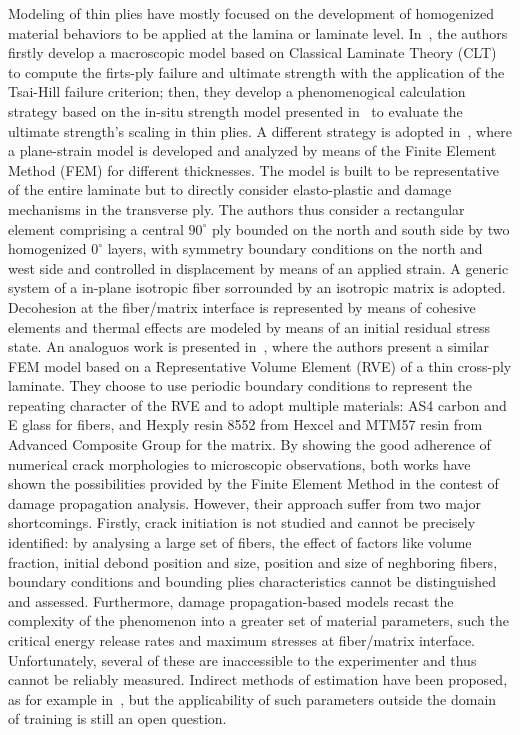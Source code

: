 \documentclass[a4paper]{jpconf}
\begin{document}
Modeling of thin plies have mostly focused on the development of homogenized material behaviors to be applied at the lamina or laminate level. In~\cite{AmacherCugnoniBotsisSorensenSmithDransfeld:2014}, the authors firstly develop a macroscopic model based on Classical Laminate Theory (CLT) to compute the firts-ply failure and ultimate strength with the application of the Tsai-Hill failure criterion; then, they develop a phenomenogical calculation strategy based on the in-situ strength model presented in~\cite{CamanhoDavilaPinhoIannucciRobinson:2006} to evaluate the ultimate strength's scaling in thin plies. A different strategy is adopted in~\cite{SaitoTakehuchiKimpara:2014}, where a plane-strain model is developed and analyzed by means of the Finite Element Method (FEM) for different thicknesses. The model is built to be representative of the entire laminate but to directly consider elasto-plastic and damage mechanisms in the transverse ply. The authors thus consider a rectangular element comprising a central $90^{\circ}$ ply bounded on the north and south side by two homogenized $0^{\circ}$ layers, with symmetry boundary conditions on the north and west side and controlled in displacement by means of an applied strain. A generic system of a in-plane isotropic fiber sorrounded by an isotropic matrix is adopted. Decohesion at the fiber/matrix interface is represented by means of cohesive elements and thermal effects are modeled by means of an initial residual stress state. An analoguos work is presented in~\cite{HerraezMoraNayaLopesGonzalezLLorca:2015}, where the authors present a similar FEM model based on a Representative Volume Element (RVE) of a thin cross-ply laminate. They choose to use periodic boundary conditions to represent the repeating character of the RVE and to adopt multiple materials: AS4 carbon and E glass for fibers, and Hexply resin 8552 from Hexcel and MTM57 resin from Advanced Composite Group for the matrix. By showing the good adherence of numerical crack morphologies to microscopic observations, both works have shown the possibilities provided by the Finite Element Method in the contest of damage propagation analysis. However, their approach suffer from two major shortcomings. Firstly, crack initiation is not studied and cannot be precisely identified: by analysing a large set of fibers, the effect of factors like volume fraction, initial debond position and size, position and size of neghboring fibers, boundary conditions and bounding plies characteristics cannot be distinguished and assessed. Furthermore, damage propagation-based models recast the complexity of the phenomenon into a greater set of material parameters, such the critical energy release rates and maximum stresses at fiber/matrix interface. Unfortunately, several of these are inaccessible to the experimenter and thus cannot be reliably measured. Indirect methods of estimation have been proposed, as for example in~\cite{CanalGonzalezSeguradoLLorca:2012}, but the applicability of such parameters outside the domain of training is still an open question.\par
\end{document}
